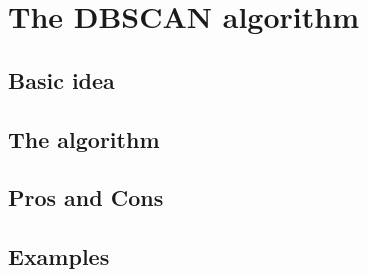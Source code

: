 \section{The DBSCAN algorithm}
  \subsection{Basic idea}
  \subsection{The algorithm}
  \subsection{Pros and Cons}
  \subsection{Examples}
